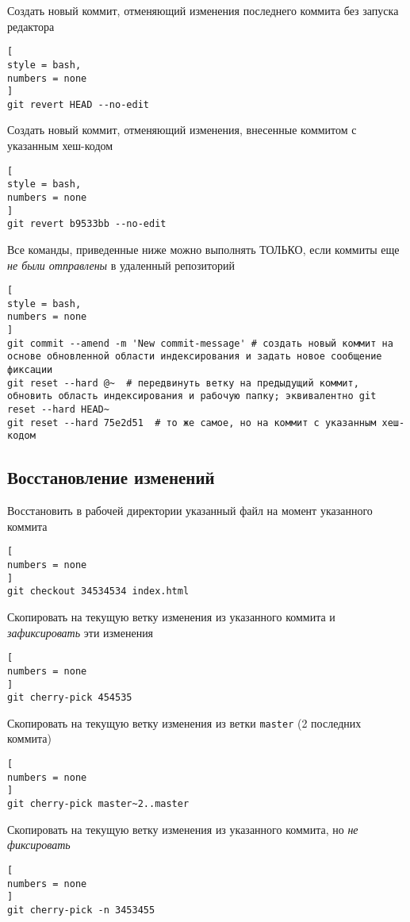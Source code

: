 \documentclass[%
	11pt,
	a4paper,
	utf8,
		]{article}
\begin{document}
Создать новый коммит, отменяющий изменения последнего коммита без запуска редактора
\begin{lstlisting}[
style = bash,
numbers = none
]
git revert HEAD --no-edit
\end{lstlisting}

Создать новый коммит, отменяющий изменения, внесенные коммитом с указанным хеш-кодом
\begin{lstlisting}[
style = bash,
numbers = none
]
git revert b9533bb --no-edit
\end{lstlisting}

Все команды, приведенные ниже можно выполнять ТОЛЬКО, если коммиты еще \emph{не были отправлены} в удаленный репозиторий
\begin{lstlisting}[
style = bash,
numbers = none
]
git commit --amend -m 'New commit-message' # создать новый коммит на основе обновленной области индексирования и задать новое сообщение фиксации
git reset --hard @~  # передвинуть ветку на предыдущий коммит, обновить область индексирования и рабочую папку; эквивалентно git reset --hard HEAD~
git reset --hard 75e2d51  # то же самое, но на коммит с указанным хеш-кодом
\end{lstlisting}

\subsection{Восстановление изменений}

Восстановить в рабочей директории указанный файл на момент указанного коммита
\begin{lstlisting}[
numbers = none
]
git checkout 34534534 index.html
\end{lstlisting}

Скопировать на текущую ветку изменения из указанного коммита и \emph{зафиксировать} эти изменения
\begin{lstlisting}[
numbers = none
]
git cherry-pick 454535
\end{lstlisting}

Скопировать на текущую ветку изменения из ветки \texttt{master} (2 последних коммита)
\begin{lstlisting}[
numbers = none
]
git cherry-pick master~2..master
\end{lstlisting}

Скопировать на текущую ветку изменения из указанного коммита, но \emph{не фиксировать}
\begin{lstlisting}[
numbers = none
]
git cherry-pick -n 3453455
\end{lstlisting}
\end{document}
